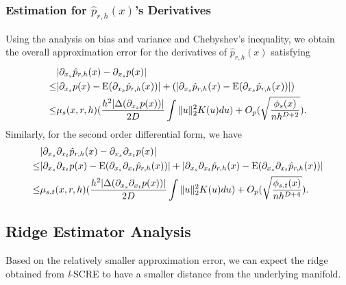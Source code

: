 \documentclass[aos,preprint]{imsart}
\theoremstyle{remark}
\begin{document}
\subsubsection{Estimation for $\hat{p}_{r,h}(x)$'s Derivatives}
Using the analysis on bias and variance and Chebyshev's inequality, we obtain the overall approximation error for the derivatives of $\hat{p}_{r,h}(x)$ satisfying
\begin{equation}\label{bias_result_final}
\begin{aligned}
 &|\partial_{x_s} \hat{p}_{r,h}(x)-\partial_{x_s} p(x)|\\
 \leq & |\partial_{x_s} p(x) - {\rm E} (\partial_{x_s}\hat{p}_{r,h}(x)) |+(|\partial_{x_s} \hat{p}_{r,h}(x) - {\rm E} (\partial_{x_s}\hat{p}_{r,h}(x)) | )\\
\leq & \mu_s(x, r, h)( \frac{ h^2|\Delta(\partial_{x_s} p(x))|}{2D}  \int \|u\|_2^2 K(u) du) + O_p(\sqrt{\frac{\phi_s(x)}{n h^{D+2}}}).
\end{aligned}
\end{equation}
Similarly, for the second order differential form, we have
\begin{equation}\label{bias_result_final2}
\begin{aligned}
 &|\partial_{x_{s}}\partial_{x_t} \hat{p}_{r,h}(x)-\partial_{x_{s}}\partial_{x_t} p(x)|\\
 \leq & |\partial_{x_{s}}\partial_{x_t} p(x) - {\rm E} (\partial_{x_{s}}\partial_{x_t} \hat{p}_{r,h}(x)) |+|\partial_{x_{s}}\partial_{x_t} \hat{p}_{r,h}(x) - {\rm E} (\partial_{x_s} \partial_{x_t} \hat{p}_{r,h}(x)) | \\
 \leq & \mu_{s,t}(x, r, h)( \frac{ h^2|\Delta(\partial_{x_s} \partial_{x_t} p(x))|}{2D}  \int \|u\|_2^2 K(u) du) + O_p(\sqrt{\frac{\phi_{s,t}(x)}{n h^{D+4}}} ).
\end{aligned}
\end{equation}
\subsection{Ridge Estimator Analysis}
Based on the relatively smaller approximation error, we can expect the ridge obtained from {\it l}-SCRE to have a smaller distance from the underlying manifold. 
\end{document}
